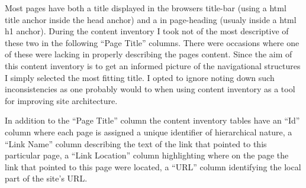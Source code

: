 Most pages have both a title displayed in the browsers title-bar (using a
html title anchor inside the head anchor) and a in page-heading (usualy inside
a html h1 anchor). During the content inventory I took not of the most
descriptive of these two in the following ``Page Title'' columns. There were
occasions where one of these were lacking in properly describing the pages
content. Since the aim of this content inventory is to get an informed picture
of the navigational structures I simply selected the most fitting title.
I opted to ignore noting down such inconsistencies as one probably would to
when using content inventory as a tool for improving site architecture.

In addition to the ``Page Title'' column the content inventory tables have an
``Id'' column where each page is assigned a unique identifier of hierarchical
nature, a ``Link Name'' column describing the text of the link that pointed to
this particular page, a ``Link Location'' column highlighting where on the
page the link that pointed to this page were located, a ``URL'' column
identifying the local part of the site's URL.

\setlength{}
  \let\LTright\LTleft

